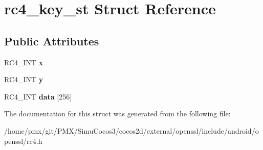 \hypertarget{structrc4__key__st}{}\section{rc4\+\_\+key\+\_\+st Struct Reference}
\label{structrc4__key__st}
\subsection*{Public Attributes}
\begin{DoxyCompactItemize}
\item 
\mbox{\label{structrc4__key__st_a0d6aa0ac8fc40a7d1464aee47b5e776d}} 
R\+C4\+\_\+\+I\+NT {\bfseries x}
\item 
\mbox{\label{structrc4__key__st_a9c19462d7de7a357d2922a3d94f89c0d}} 
R\+C4\+\_\+\+I\+NT {\bfseries y}
\item 
\mbox{\label{structrc4__key__st_af0465891d60323543b057299d74f804a}} 
R\+C4\+\_\+\+I\+NT {\bfseries data} \mbox{[}256\mbox{]}
\end{DoxyCompactItemize}


The documentation for this struct was generated from the following file\+:\begin{DoxyCompactItemize}
\item 
/home/pmx/git/\+P\+M\+X/\+Simu\+Cocos3/cocos2d/external/openssl/include/android/openssl/rc4.\+h\end{DoxyCompactItemize}
